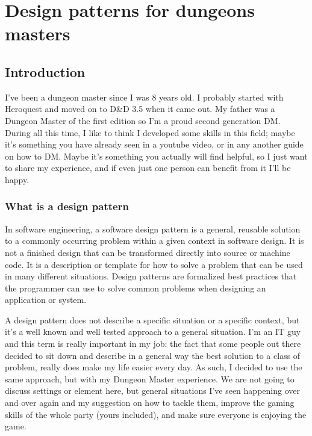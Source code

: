 \documentclass[letterpaper,10pt,twoside,twocolumn,openany]{book}
\begin{document}

\chapter{Design patterns for
\newline 
dungeons masters}

\section{Introduction}
I've been a dungeon master since I was 8 years old. I probably started with Heroquest and moved on to D\&D 3.5 when it came out. My father was a Dungeon Master of the first edition so I'm a proud second generation DM. During all this time, I like to think I developed some skills in this field; maybe it's something you have already seen in a youtube video, or in any another guide on how to DM. Maybe it's something you actually will find helpful, so I just want to share my experience, and if even just one person can benefit from it I'll be happy.

\subsection{What is a design pattern}
In software engineering, a software design pattern is a general, reusable solution to a commonly occurring problem within a given context in software design. It is not a finished design that can be transformed directly into source or machine code. It is a description or template for how to solve a problem that can be used in many different situations. Design patterns are formalized best practices that the programmer can use to solve common problems when designing an application or system\cite{wikipedia}.

A design pattern does not describe a specific situation or a specific context, but it's a well known and well tested approach to a general situation. I'm an IT guy and this term is really important in my job: the fact that some people out there decided to sit down and describe in a general way the best solution to a class of problem, really does make my life easier every day. As such, I decided to use the same approach, but with my Dungeon Master experience. We are not going to discuss settings or element here, but general situations I've seen happening over and over again and my suggestion on how to tackle them, improve the gaming skills of the whole party (yours included), and make sure everyone is enjoying the game.
\end{document}
